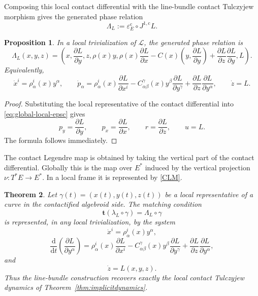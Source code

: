 \documentclass[11pt]{article}
\newtheorem{theorem}{Theorem}[section]
\newtheorem{proposition}[theorem]{Proposition}
\newcommand{\dd}{\mathrm{d}}
\newcommand{\Lbundle}{\mathcal{L}}
\begin{document}
Composing this local contact differential with the line-bundle contact Tulczyjew morphism gives
the generated phase relation
\[
\Lambda_L:=\varepsilon_E^{\mathrm c}\circ J^{1,\mathrm c}L.
\]

\begin{proposition}
\label{prop:local-generated-relation}
In a local trivialization of \(\Lbundle\), the generated phase relation is
\[
\Lambda_L(x,y,z)
=
\left(
x,
\frac{\partial L}{\partial y},
z,
\rho(x)y,
\rho(x)\frac{\partial L}{\partial x}
-
C(x)\left(y,\frac{\partial L}{\partial y}\right)
+
\frac{\partial L}{\partial z}
\frac{\partial L}{\partial y},
L
\right).
\]
Equivalently,
\[
\dot x^i=\rho^i_\alpha(x)y^\alpha,\qquad
\dot p_\alpha=
\rho^i_\alpha(x)\frac{\partial L}{\partial x^i}
-
C^\gamma_{\alpha\beta}(x)y^\beta
\frac{\partial L}{\partial y^\gamma}
+
\frac{\partial L}{\partial z}
\frac{\partial L}{\partial y^\alpha},
\qquad
\dot z=L.
\]
\end{proposition}

\begin{proof}
Substituting the local representative of the contact differential into
\eqref{eq:global-local-epsc} gives
\[
p_y=\frac{\partial L}{\partial y},\qquad
p_x=\frac{\partial L}{\partial x},\qquad
r=\frac{\partial L}{\partial z},\qquad
u=L.
\]
The formula follows immediately.
\end{proof}

The contact Legendre map is obtained by taking the vertical part of the contact differential.
Globally this is the map over \(E^*\) induced by the vertical projection
\(\nu:T^*E\to E^*\). In a local frame it is represented by \eqref{CLM}.

\begin{theorem}
\label{thm:recovery-local-dynamics}
Let \(\gamma(t)=(x(t),y(t),z(t))\) be a local representative of a curve in the
contactified algebroid side. The matching condition
\[
\mathbf t(\lambda_L\circ\gamma)=\Lambda_L\circ\gamma
\]
is represented, in any local trivialization, by the system
\[
\dot x^i=\rho^i_\alpha(x)y^\alpha,
\]
\[
\frac{\dd}{\dd t}
\left(
\frac{\partial L}{\partial y^\alpha}
\right)
=
\rho^i_\alpha(x)\frac{\partial L}{\partial x^i}
-
C^\gamma_{\alpha\beta}(x)y^\beta
\frac{\partial L}{\partial y^\gamma}
+
\frac{\partial L}{\partial z}
\frac{\partial L}{\partial y^\alpha},
\]
and
\[
\dot z=L(x,y,z).
\]
Thus the line-bundle construction recovers exactly the local contact Tulczyjew dynamics
of Theorem~\ref{thm:implicitdynamics}.
\end{theorem}
\end{document}

